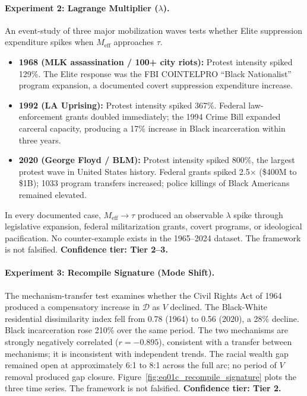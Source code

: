 \paragraph{Experiment 2: Lagrange Multiplier ($\lambda$).}
An event-study of three major mobilization waves tests whether Elite suppression expenditure spikes when $M_{\mathrm{eff}}$ approaches $\tau$.
\begin{itemize}
    \item \textbf{1968 (MLK assassination / 100+ city riots):} Protest intensity spiked 129\%. The Elite response was the FBI COINTELPRO ``Black Nationalist'' program expansion, a documented covert suppression expenditure increase.
    \item \textbf{1992 (LA Uprising):} Protest intensity spiked 367\%. Federal law-enforcement grants doubled immediately; the 1994 Crime Bill expanded carceral capacity, producing a 17\% increase in Black incarceration within three years.
    \item \textbf{2020 (George Floyd / BLM):} Protest intensity spiked 800\%, the largest protest wave in United States history. Federal grants spiked 2.5$\times$ (\$400M to \$1B); 1033 program transfers increased; police killings of Black Americans remained elevated.
\end{itemize}
In every documented case, $M_{\mathrm{eff}} \to \tau$ produced an observable $\lambda$ spike through legislative expansion, federal militarization grants, covert programs, or ideological pacification. No counter-example exists in the 1965--2024 dataset. The framework is not falsified. \textbf{Confidence tier: Tier 2--3.}

\paragraph{Experiment 3: Recompile Signature (Mode Shift).}
The mechanism-transfer test examines whether the Civil Rights Act of 1964 produced a compensatory increase in $\mathcal{D}$ as $V$ declined. The Black-White residential dissimilarity index fell from 0.78 (1964) to 0.56 (2020), a 28\% decline. Black incarceration rose 210\% over the same period. The two mechanisms are strongly negatively correlated ($r = -0.895$), consistent with a transfer between mechanisms; it is inconsistent with independent trends. The racial wealth gap remained open at approximately 6:1 to 8:1 across the full arc; no period of $V$ removal produced gap closure. Figure~\ref{fig:eq01c_recompile_signature} plots the three time series. The framework is not falsified. \textbf{Confidence tier: Tier 2.}

